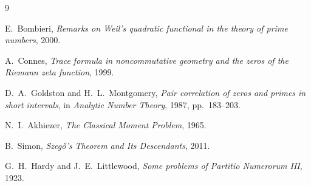 \documentclass[11pt,a4paper]{amsart}
\begin{document}
\begin{thebibliography}{9}

E.~Bombieri,
\emph{Remarks on Weil's quadratic functional in the theory of prime numbers},
2000.

A.~Connes,
\emph{Trace formula in noncommutative geometry and the zeros of the Riemann
zeta function},
1999.

D.~A.~Goldston and H.~L.~Montgomery,
\emph{Pair correlation of zeros and primes in short intervals},
in \emph{Analytic Number Theory}, 1987, pp.~183--203.

N.~I.~Akhiezer,
\emph{The Classical Moment Problem},
1965.

B.~Simon,
\emph{Szeg\H{o}'s Theorem and Its Descendants},
2011.

G.~H.~Hardy and J.~E.~Littlewood,
\emph{Some problems of Partitio Numerorum III},
1923.

\end{thebibliography}
\end{document}
